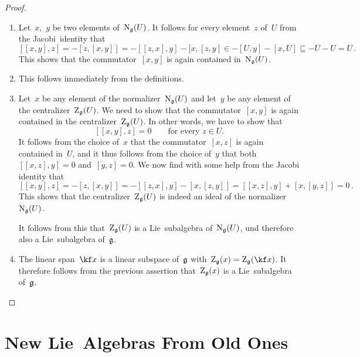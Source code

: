 \begin{proof}
  \leavevmode
  \begin{enumerate}
    \item
      Let~$x$,~$y$ be two elements of~$\operatorname{N}_{\mathfrak{g}}(U)$.
      It follows for every element~$z$ of~$U$ from the Jacobi~identity that
      \[
        [[x,y], z]
        =
        - [z, [x,y]]
        =
        - [[z,x], y] - [x, [z,y]
        \in
        - [U, y] - [x, U]
        \subseteq
        - U - U
        =
        U \,.
      \]
      This shows that the commutator~$[x,y]$ is again contained in~$\operatorname{N}_{\mathfrak{g}}(U)$.
    \item
      This follows immediately from the definitions.
    \item
      Let~$x$ be any element of the normalizer~$\operatorname{N}_{\mathfrak{g}}(U)$ and let~$y$ be any element of the centralizer~$\operatorname{Z}_{\mathfrak{g}}(U)$.
      We need to show that the commutator~$[x,y]$ is again contained in the centralizer~$\operatorname{Z}_{\mathfrak{g}}(U)$.
      In other words, we have to show that
      \[
        [[x,y],z] = 0
        \qquad
        \text{for every~$z \in U$.}
      \]
      It follows from the choice of~$x$ that the commutator~$[x,z]$ is again contained in~$U$, and it thus follows from the choice of~$y$ that both~$[[x,z],y] = 0$ and~$[y,z] = 0$.
      We now find with some help from the Jacobi identity that
      \[
        [[x,y], z]
        =
        -[z, [x,y]]
        =
        -[[z, x], y] - [x, [z, y]]
        =
        [[x,z], y] + [x, [y, z]]
        =
        0 \,.
      \]
      This shows that the centralizer~$\operatorname{Z}_{\mathfrak{g}}(U)$ is indeed an ideal of the normalizer~$\operatorname{N}_{\mathfrak{g}}(U)$.

      It follows from this that~$\operatorname{Z}_{\mathfrak{g}}(U)$ is a Lie~subalgebra of~$\operatorname{N}_{\mathfrak{g}}(U)$, und therefore also a Lie~subalgebra of~$\mathfrak{g}$.
    \item 
      The linear span~$\kf x$ is a linear subspace of~$\mathfrak{g}$ with~$\centerlie_{\glie}(x) = \centerlie_{\glie}(\kf x)$.
      It therefore follows from the previous assertion that~$\operatorname{Z}_{\mathfrak{g}}(x)$ is a Lie~subalgebra of~$\mathfrak{g}$.
    \qedhere
  \end{enumerate}
\end{proof}





\section{New Lie~Algebras From Old Ones}


